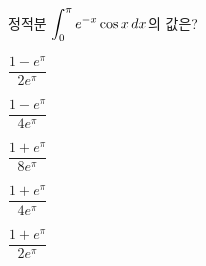 \hspace*{2mm}\begin{minipage}[t]{\dimexpr\linewidth-2mm\relax}\vspace{0pt}
정적분 $\displaystyle\int_{0}^{\pi}e^{-x}\cos x\mkern3mu dx$의 값은?
\begin{choices32}{\rule[-3ex]{0pt}{8ex}$\dfrac{1-e^{\pi}}{2e^{\pi}}$}{\rule[-3ex]{0pt}{8ex}$\dfrac{1-e^{\pi}}{4e^{\pi}}$}{\rule[-3ex]{0pt}{8ex}$\dfrac{1+e^{\pi}}{8e^{\pi}}$}{\rule[-3ex]{0pt}{8ex}$\dfrac{1+e^{\pi}}{4e^{\pi}}$}{\rule[-3ex]{0pt}{8ex}$\dfrac{1+e^{\pi}}{2e^{\pi}}$}\end{choices32}\end{minipage}
